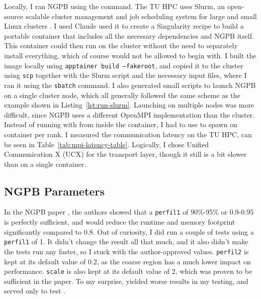 Locally, I ran NGPB using the   command.
The TU HPC uses Slurm, an open-source scalable cluster management and job scheduling system for large and small Linux clusters \cite{slurm_overview}. 
I used Claude used it to create a Singularity recipe \cite{kurtzer2017singularity} to build a portable container that includes all the necessary dependencies and NGPB itself.
This container could then run on the cluster without the need to separately install everything, which of course would not be allowed to begin with.
I built the image locally using \texttt{apptainer build --fakeroot}, and copied it to the cluster using \texttt{scp} together with the Slurm script and the necessary input files, where I ran it using the \texttt{sbatch} command.
I also generated small scripts to launch NGPB on a single cluster node, which all generally followed the same scheme as the example shown in Listing~\ref{lst:run-slurm}.
Launching on multiple nodes was more difficult, since NGPB uses a different OpenMPI implementation than the cluster.
Instead of running with  from inside the container, I had to use  to spawn on container per rank.
I measured the communication latency on the TU HPC, can be seen in Table~\ref{tab:mpi-latency-table}.
Logically, I chose Unified Communication X (UCX) for the transport layer, though it still is a bit slower than  on a single container.





\subsection{NGPB Parameters}
\label{sec:evaluation-experimental-setup-ngpb-parameters}

In the NGPB paper \cite{diflorio2025nextgenpb}, the authors showed that a \texttt{perfil1} of 90\%-95\% or 0.9-0.95 is perfectly sufficient, and would reduce the runtime and memory footprint significantly compared to 0.8.
Out of curiosity, I did run a couple of tests using a \texttt{perfil1} of 1. It didn't change the result all that much, and it also didn't make the tests run any faster, so I stuck with the author-approved values.
\texttt{perfil2} is kept at its default value of 0.2, as the coarse region has a much lower impact on performance. 
\texttt{scale} is also kept at its default value of 2, which was proven to be sufficient in the paper.
To my surprise,  yielded worse results in my testing, and served only to test .

